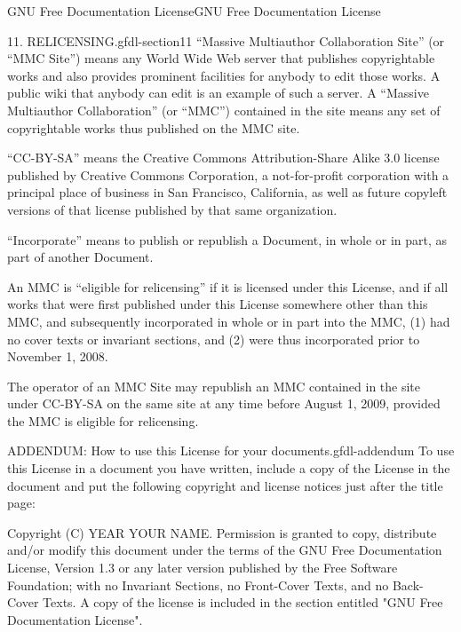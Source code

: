 \documentclass[10pt,]{book}
\numberwithin{equation}{section}
\begin{document}
\begin{appendixptx}{GNU Free Documentation License}{}{GNU Free Documentation License}{}{}
\begin{paragraphs}{11. RELICENSING.}{gfdl-section11}%
\hypertarget{p-576}{}%
``Massive Multiauthor Collaboration Site'' (or ``MMC Site'') means any World Wide Web server that publishes copyrightable works and also provides prominent facilities for anybody to edit those works. A public wiki that anybody can edit is an example of such a server. A ``Massive Multiauthor Collaboration'' (or ``MMC'') contained in the site means any set of copyrightable works thus published on the MMC site.%
\par
\hypertarget{p-577}{}%
``CC-BY-SA'' means the Creative Commons Attribution-Share Alike 3.0 license published by Creative Commons Corporation, a not-for-profit corporation with a principal place of business in San Francisco, California, as well as future copyleft versions of that license published by that same organization.%
\par
\hypertarget{p-578}{}%
``Incorporate'' means to publish or republish a Document, in whole or in part, as part of another Document.%
\par
\hypertarget{p-579}{}%
An MMC is ``eligible for relicensing'' if it is licensed under this License, and if all works that were first published under this License somewhere other than this MMC, and subsequently incorporated in whole or in part into the MMC, (1) had no cover texts or invariant sections, and (2) were thus incorporated prior to November 1, 2008.%
\par
\hypertarget{p-580}{}%
The operator of an MMC Site may republish an MMC contained in the site under CC-BY-SA on the same site at any time before August 1, 2009, provided the MMC is eligible for relicensing.%
\end{paragraphs}%
\begin{paragraphs}{ADDENDUM: How to use this License for your documents.}{gfdl-addendum}%
\hypertarget{p-581}{}%
To use this License in a document you have written, include a copy of the License in the document and put the following copyright and license notices just after the title page:%
\begin{preformatted}
Copyright (C)  YEAR  YOUR NAME.
Permission is granted to copy, distribute and/or modify this document
under the terms of the GNU Free Documentation License, Version 1.3
or any later version published by the Free Software Foundation;
with no Invariant Sections, no Front-Cover Texts, and no Back-Cover Texts.
A copy of the license is included in the section entitled "GNU
Free Documentation License".
\end{preformatted}

\end{paragraphs}
\end{appendixptx}
\end{document}
